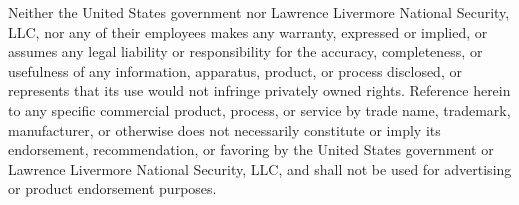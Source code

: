 {{Neither the United States government nor Lawrence Livermore National Security,
LLC, nor any of their employees makes any warranty, expressed or implied, or
assumes any legal liability or responsibility for the accuracy, completeness,
or usefulness of any information, apparatus, product, or process disclosed, or
represents that its use would not infringe privately owned rights.
%
Reference herein to any specific commercial product, process, or service by
trade name, trademark, manufacturer, or otherwise does not necessarily
constitute or imply its endorsement, recommendation, or favoring by the United
States government or Lawrence Livermore National Security, LLC, and shall not
be used for advertising or product endorsement purposes.
} %

}
